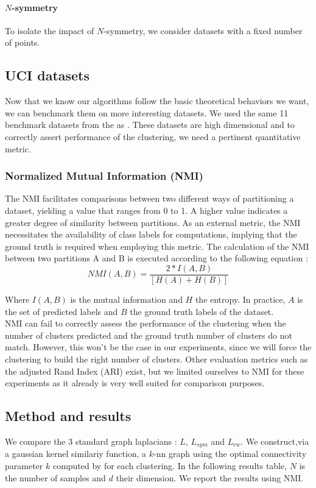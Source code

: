 \documentclass[a4paper,12pt]{article}
\theoremstyle{definition}
\theoremstyle{plain}
\begin{document}
\paragraph{$N$-symmetry}
To isolate the impact of $N$-symmetry, we consider datasets with a fixed number of points.

\subsection{UCI datasets}
Now that we know our algorithms follow the basic theoretical behaviors we want, we can benchmark them on more interesting datasets.
We used the same 11 benchmark datasets from the \cite[UCI ML repository]{UCI} as \cite[Jonckheere et.al]{GSC}. These datasets are high dimensional and to correctly assert performance of the clustering, we need a pertinent quantitative metric.
\subsubsection{Normalized Mutual Information (NMI)}
The NMI facilitates comparisons between two different ways of partitioning a dataset, yielding a value that ranges from 0 to 1. A higher value indicates a greater degree of similarity between partitions. As an external metric, the NMI necessitates the availability of class labels for computations, implying that the ground truth is required when employing this metric.
The calculation of the NMI between two partitions A and B is executed according to the following equation :
$$NMI\left(A,B\right)=\frac{2*I(A,B)}{[H\left(A\right)+H(B)]}$$
	
	Where $I(A,B)$ is the mutual information and $H$ the entropy. 
	In practice, $A$ is the set of predicted labels and $B$ the ground truth labels of the dataset. \\ NMI can fail to correctly assess the performance of the clustering when the number of clusters predicted and the ground truth number of clusters do not match. However, this won't be the case in our experiments, since we will force the clustering to build the right number of clusters.
	Other evaluation metrics such as the adjusted Rand Index (ARI) exist, but we limited ourselves to NMI for these experiments as it already is very well suited for comparison purposes.
\subsection{Method and results}
We compare the $3$ standard graph laplacians : $L$, $L_{sym}$ and $L_{rw}$. We construct,via a gaussian kernel similariy function, a $k$-nn graph using the optimal connectivity parameter $k$ computed by \cite[Jonckheere et.al]{GSC} for each clustering. In the following results table, $N$ is the number of samples and $d$ their dimension. We report the results using NMI.
\end{document}
